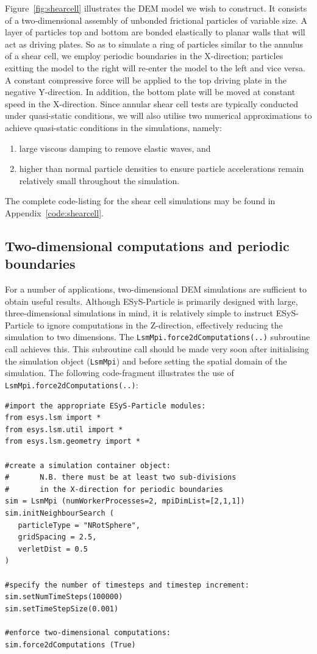 Figure~\ref{fig:shearcell} illustrates the DEM model we wish to construct. It consists of a two-dimensional assembly of unbonded frictional particles of variable size. A layer of particles top and bottom are bonded elastically to planar walls that will act as driving plates. So as to simulate a ring of particles similar to the annulus of a shear cell, we employ periodic boundaries in the X-direction; particles exitting the model to the right will re-enter the model to the left and vice versa. A constant compressive force will be applied to the top driving plate in the negative Y-direction. In addition, the bottom plate will be moved at constant speed in the X-direction. Since annular shear cell tests are typically conducted under quasi-static conditions, we will also utilise two numerical approximations to achieve quasi-static conditions in the simulations, namely: 
\begin{enumerate}
   \item large viscous damping to remove elastic waves, and 
   \item higher than normal particle densities to ensure particle accelerations remain relatively small throughout the simulation.
\end{enumerate}

\noindent
The complete code-listing for the shear cell simulations may be found in Appendix~\ref{code:shearcell}.

\subsection{Two-dimensional computations and periodic boundaries}

For a number of applications, two-dimensional DEM simulations are sufficient to obtain useful results. Although ESyS-Particle is primarily designed with large, three-dimensional simulations in mind, it is relatively simple to instruct ESyS-Particle to ignore computations in the Z-direction, effectively reducing the simulation to two dimensions. The \texttt{LsmMpi.force2dComputations(..)} subroutine call achieves this. This subroutine call should be made very soon after initialising the simulation object (\texttt{LsmMpi}) and before setting the spatial domain of the simulation. The following code-fragment illustrates the use of \texttt{LsmMpi.force2dComputations(..)}:

\begin{verbatim}
#import the appropriate ESyS-Particle modules:
from esys.lsm import *
from esys.lsm.util import *
from esys.lsm.geometry import *

#create a simulation container object:
#       N.B. there must be at least two sub-divisions 
#       in the X-direction for periodic boundaries
sim = LsmMpi (numWorkerProcesses=2, mpiDimList=[2,1,1])
sim.initNeighbourSearch (
   particleType = "NRotSphere",
   gridSpacing = 2.5,
   verletDist = 0.5
)

#specify the number of timesteps and timestep increment:
sim.setNumTimeSteps(100000)
sim.setTimeStepSize(0.001)

#enforce two-dimensional computations:
sim.force2dComputations (True)
\end{verbatim}

